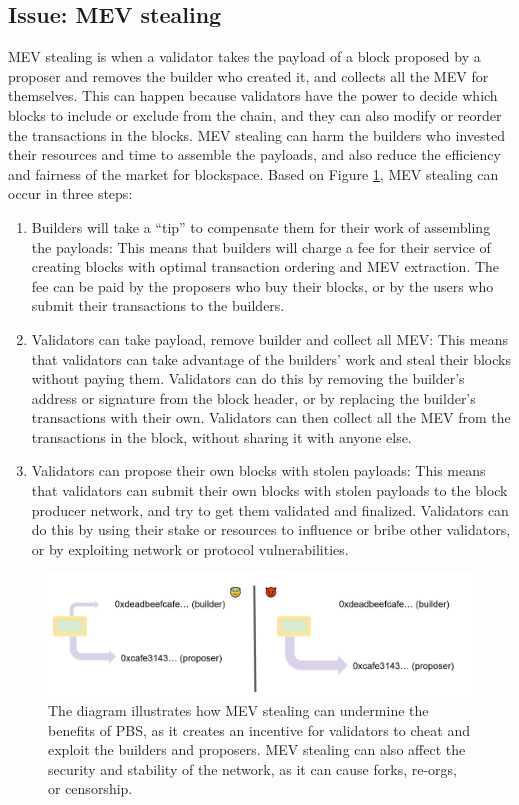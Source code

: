 \documentclass{report}
\begin{document}
 \subsection{Issue: MEV stealing}
MEV stealing is when a validator takes the payload of a block proposed by a proposer and removes the builder who created it, and collects all the MEV for themselves. This can happen because validators have the power to decide which blocks to include or exclude from the chain, and they can also modify or reorder the transactions in the blocks. MEV stealing can harm the builders who invested their resources and time to assemble the payloads, and also reduce the efficiency and fairness of the market for blockspace.
Based on Figure \ref{fig:f4}, MEV stealing can occur in three steps:
\begin{enumerate}
	\item Builders will take a “tip” to compensate them for their work of assembling the payloads: This means that builders will charge a fee for their service of creating blocks with optimal transaction ordering and MEV extraction. The fee can be paid by the proposers who buy their blocks, or by the users who submit their transactions to the builders.
	\item Validators can take payload, remove builder and collect all MEV: This means that validators can take advantage of the builders’ work and steal their blocks without paying them. Validators can do this by removing the builder’s address or signature from the block header, or by replacing the builder’s transactions with their own. Validators can then collect all the MEV from the transactions in the block, without sharing it with anyone else.
	\item Validators can propose their own blocks with stolen payloads: This means that validators can submit their own blocks with stolen payloads to the block producer network, and try to get them validated and finalized. Validators can do this by using their stake or resources to influence or bribe other validators, or by exploiting network or protocol vulnerabilities.
\end{enumerate}
\begin{center}
	\begin{figure}
		\centering
		\includegraphics[width=0.8\linewidth]{Fig/F4}
		\caption{The diagram illustrates how MEV stealing can undermine the benefits of PBS, as it creates an incentive for validators to cheat and exploit the builders and proposers. MEV stealing can also affect the security and stability of the network, as it can cause forks, re-orgs, or censorship.}
		\label{fig:f4}
	\end{figure}
\end{center}
\end{document}

